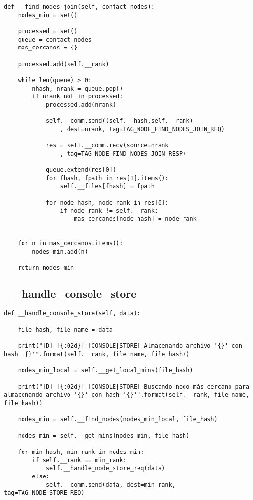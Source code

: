 \begin{lstlisting}
def __find_nodes_join(self, contact_nodes):
    nodes_min = set()

    processed = set()
    queue = contact_nodes
    mas_cercanos = {}

    processed.add(self.__rank)

    while len(queue) > 0:
        nhash, nrank = queue.pop()                                 
        if nrank not in processed:
            processed.add(nrank)

            self.__comm.send((self.__hash,self.__rank)
				, dest=nrank, tag=TAG_NODE_FIND_NODES_JOIN_REQ)
            
            res = self.__comm.recv(source=nrank
				, tag=TAG_NODE_FIND_NODES_JOIN_RESP)

            queue.extend(res[0])
            for fhash, fpath in res[1].items():
                self.__files[fhash] = fpath

            for node_hash, node_rank in res[0]:
                if node_rank != self.__rank:
                    mas_cercanos[node_hash] = node_rank


    for n in mas_cercanos.items():
        nodes_min.add(n)

    return nodes_min
\end{lstlisting}


\subsection{\_\_handle\_console\_store}

\begin{lstlisting}
def __handle_console_store(self, data):

    file_hash, file_name = data

    print("[D] [{:02d}] [CONSOLE|STORE] Almacenando archivo '{}' con hash '{}'".format(self.__rank, file_name, file_hash))

    nodes_min_local = self.__get_local_mins(file_hash)

    print("[D] [{:02d}] [CONSOLE|STORE] Buscando nodo más cercano para almacenando archivo '{}' con hash '{}'".format(self.__rank, file_name, file_hash))

    nodes_min = self.__find_nodes(nodes_min_local, file_hash)

    nodes_min = self.__get_mins(nodes_min, file_hash)

    for min_hash, min_rank in nodes_min:
        if self.__rank == min_rank:
            self.__handle_node_store_req(data)
        else:
            self.__comm.send(data, dest=min_rank, tag=TAG_NODE_STORE_REQ)

\end{lstlisting}


